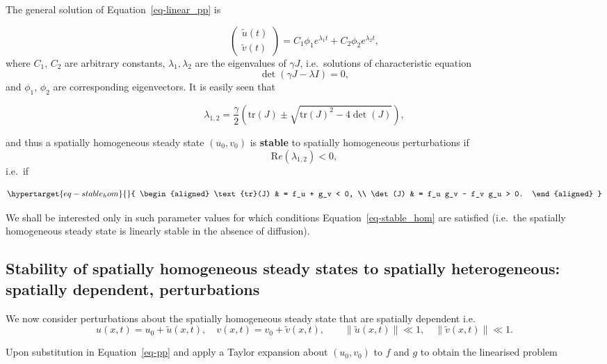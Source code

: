 \documentclass[
  letterpaper,
  DIV=11,
  numbers=noendperiod]{scrreprt}
\theoremstyle{plain}
\theoremstyle{definition}
\theoremstyle{plain}
\theoremstyle{remark}
\begin{document}
The general solution of Equation~\ref{eq-linear_pp} is

\[
 \begin{pmatrix} 
\tilde u(t) \\
\tilde v(t)
\end{pmatrix}   =  C_1 \phi_1 e^{\lambda_1 t} +  C_2 \phi_2 e^{\lambda_2 t}  , 
\] where \(C_1\), \(C_2\) are arbitrary constants,
\(\lambda_1, \lambda_2\) are the eigenvalues of \(\gamma J\),
i.e.~solutions of characteristic equation \[
\det (\gamma J - \lambda I) = 0,
\] and \(\phi_1\), \(\phi_2\) are corresponding eigenvectors. It is
easily seen that

\[
\lambda_{1,2} = \frac \gamma 2 \left( \text{tr} (J) \pm \sqrt{ \text{tr}(J)^2 - 4 \det(J)} \right),
\]

and thus a spatially homogeneous steady state \((u_0, v_0)\) is
\textbf{stable} to spatially homogeneous perturbations if \[
{\mathrm Re}( \lambda_{1,2}) <0,
\] i.e.~if

\begin{equation}\protect\hypertarget{eq-stable_hom}{}{
\begin{aligned}
\text{tr}(J) & = f_u + g_v < 0, \\
\det(J) & = f_u g_v - f_v g_u > 0. 
\end{aligned}
}\label{eq-stable_hom}\end{equation}

We shall be interested only in such parameter values for which
conditions Equation~\ref{eq-stable_hom} are satisfied (i.e.~the
spatially homogeneous steady state is linearly stable in the absence of
diffusion).

\hypertarget{stability-of-spatially-homogeneous-steady-states-to-spatially-heterogeneous-spatially-dependent-perturbations}{%
\subsection{Stability of spatially homogeneous steady states to
spatially heterogeneous: spatially dependent,
perturbations}\label{stability-of-spatially-homogeneous-steady-states-to-spatially-heterogeneous-spatially-dependent-perturbations}}

We now consider perturbations about the spatially homogeneous steady
state that are spatially dependent i.e.~ \[
u(x,t) = u_0 + \tilde u(x,t), \quad  v(x,t) = v_0 + \tilde v(x,t), \qquad \|\tilde u(x,t) \| \ll 1, \quad  \|\tilde v(x,t) \| \ll 1 .
\]

Upon substitution in Equation~\ref{eq-pp} and apply a Taylor expansion
about \((u_0, v_0)\) to \(f\) and \(g\) to obtain the linearised problem
\end{document}
